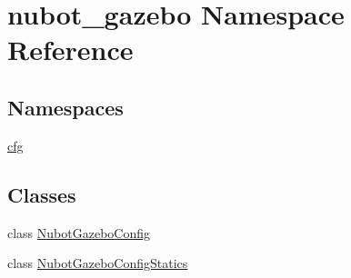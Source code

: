 \hypertarget{namespacenubot__gazebo}{\section{nubot\-\_\-gazebo Namespace Reference}
\label{namespacenubot__gazebo}
}
\subsection*{Namespaces}
\begin{DoxyCompactItemize}
\item 
\hyperlink{namespacenubot__gazebo_1_1cfg}{cfg}
\end{DoxyCompactItemize}
\subsection*{Classes}
\begin{DoxyCompactItemize}
\item 
class \hyperlink{classnubot__gazebo_1_1NubotGazeboConfig}{Nubot\-Gazebo\-Config}
\item 
class \hyperlink{classnubot__gazebo_1_1NubotGazeboConfigStatics}{Nubot\-Gazebo\-Config\-Statics}
\end{DoxyCompactItemize}
